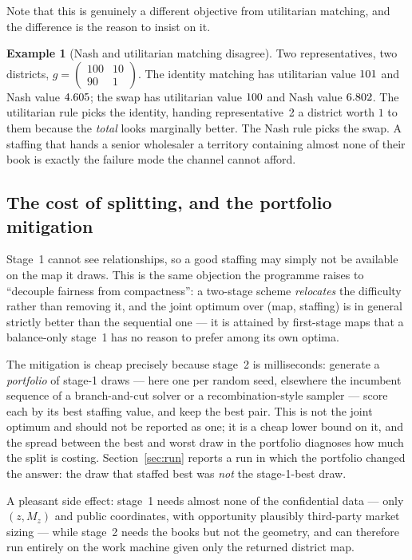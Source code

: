 \documentclass[11pt]{article}
\theoremstyle{definition}
\newtheorem{example}{Example}
\begin{document}
Note that this is genuinely a different objective from utilitarian matching, and the
difference is the reason to insist on it.

\begin{example}[Nash and utilitarian matching disagree]\label{ex:match}
Two representatives, two districts, $g=\begin{pmatrix}100&10\\90&1\end{pmatrix}$. The
identity matching has utilitarian value $101$ and Nash value
$4.605$; the swap has utilitarian value $100$ and Nash value
$6.802$. The utilitarian rule picks the identity, handing representative~2 a
district worth $1$ to them because the \emph{total} looks marginally better. The Nash rule
picks the swap. A staffing that hands a senior wholesaler a territory containing almost
none of their book is exactly the failure mode the channel cannot afford.
\end{example}

\subsection{The cost of splitting, and the portfolio mitigation}\label{sec:portfolio}

Stage~1 cannot see relationships, so a good staffing may simply not be available on the map
it draws. This is the same objection the programme raises to ``decouple fairness from
compactness'': a two-stage scheme \emph{relocates} the difficulty rather than removing it,
and the joint optimum over (map, staffing) is in general strictly better than the
sequential one --- it is attained by first-stage maps that a balance-only stage~1 has no
reason to prefer among its own optima.

The mitigation is cheap precisely because stage~2 is milliseconds: generate a
\emph{portfolio} of stage-1 draws --- here one per random seed, elsewhere the incumbent
sequence of a branch-and-cut solver or a recombination-style sampler
\citep{deford2021} --- score each by its best staffing value, and keep the best pair. This
is not the joint optimum and should not be reported as one; it is a cheap lower bound on
it, and the spread between the best and worst draw in the portfolio diagnoses how much the
split is costing. Section~\ref{sec:run} reports a run in which the portfolio changed the
answer: the draw that staffed best was \emph{not} the stage-1-best draw.

A pleasant side effect: stage~1 needs almost none of the confidential data --- only
$(z,M_z)$ and public coordinates, with opportunity plausibly third-party market sizing ---
while stage~2 needs the books but not the geometry, and can therefore run entirely on the
work machine given only the returned district map.
\end{document}
